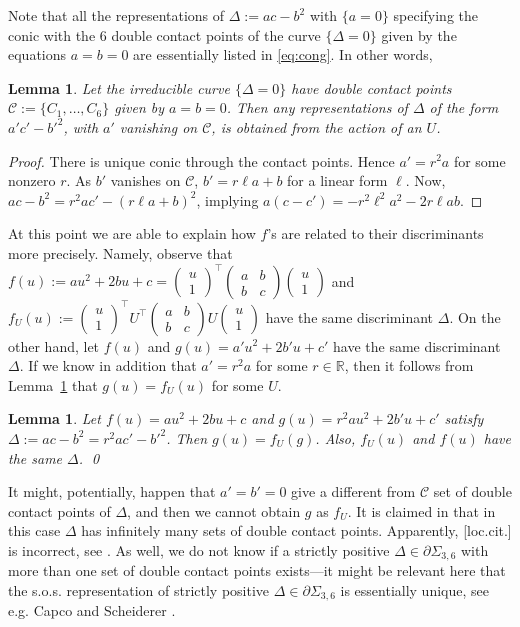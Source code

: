 \documentclass[a4paper,twoside,reqno]{amsart}
\newcommand{\RR}{\mathbb{R}}
\newcommand{\SosH}[2]{\Sigma_{{#1},{#2}}}
\theoremstyle{plain}
\newtheorem{lem}[prop]{Lemma}
\theoremstyle{definition}
\theoremstyle{remark}
\begin{document}
Note that all the representations of $\Delta:=ac-b^2$ with $\{a=0\}$ specifying the conic with 
the 6 double contact points  of the curve $\{\Delta=0\}$ given by the equations $a=b=0$  are essentially listed in \eqref{eq:cong}. In other words,
\begin{lem}\label{lem:cong}
Let the irreducible curve $\{\Delta=0\}$ have double contact points $\mathcal{C}:=\{C_1,\dots,C_6\}$ given by $a=b=0$. Then any representations of $\Delta$ of the form $a'c'-b'^2$,
with $a'$ vanishing on $\mathcal{C}$, is obtained from the action of an $U$.
\end{lem}
\begin{proof} There is unique conic through the contact points. Hence $a'=r^2a$ for some nonzero $r$. As $b'$ vanishes on $\mathcal{C}$, $b'=r\ell a+b$ for a linear form $\ell$. Now, $ac-b^2=r^2ac'-(r\ell a+b)^2$, implying
$a(c-c')=-r^2\ell^2 a^2-2r\ell a b$.
\end{proof}

 
At this point we are able to explain how $f$'s are related to their
discriminants more precisely. Namely, observe that 
\newcommand{\uv}{\begin{pmatrix} u\\ 1\end{pmatrix}}
$f(u):=au^2+2bu+c=\uv^\top \begin{pmatrix}a&b\\ b&c\end{pmatrix} \uv$
and $f_U(u):=\uv^\top U^\top \begin{pmatrix}a&b\\ b&c\end{pmatrix}U \uv$
have the same discriminant $\Delta$. On the other hand, let $f(u)$ and $g(u)=a'u^2+2b' u+c'$ have the same discriminant $\Delta$. 
If we know in addition that $a'=r^2a$ for some $r\in\RR$, then it follows
from Lemma~\ref{lem:cong} that $g(u)=f_U(u)$ for some $U$.
\begin{lem}\label{lem:cong44}
  Let $f(u)=au^2+2bu+c$ and $g(u)=r^2au^2+2b'u+c'$ satisfy $\Delta:=ac-b^2=r^2ac'-b'^2$. Then $g(u)=f_U(g)$. Also, $f_U(u)$ and $f(u)$ have
  the same $\Delta$. \qed
\end{lem}
It might, potentially, happen that $a'=b'=0$ give a different
from $\mathcal{C}$ set of double contact points of $\Delta$, and then we
cannot obtain $g$ as $f_U$. It is claimed in \cite[Chapter~I.3]{zbMATH06551558} that in this case $\Delta$ has infinitely many
sets of double contact points. Apparently, [loc.cit.]
is incorrect, see \cite{abx507635}.
As well, we do not know if a strictly positive $\Delta\in\partial\SosH{3}{6}$ with more than one
set of double contact points exists---it might be relevant here that the s.o.s. representation of strictly positive $\Delta\in\partial\SosH{3}{6}$ is essentially unique, see e.g. Capco and Scheiderer \cite{MR4275922}.
\end{document}
